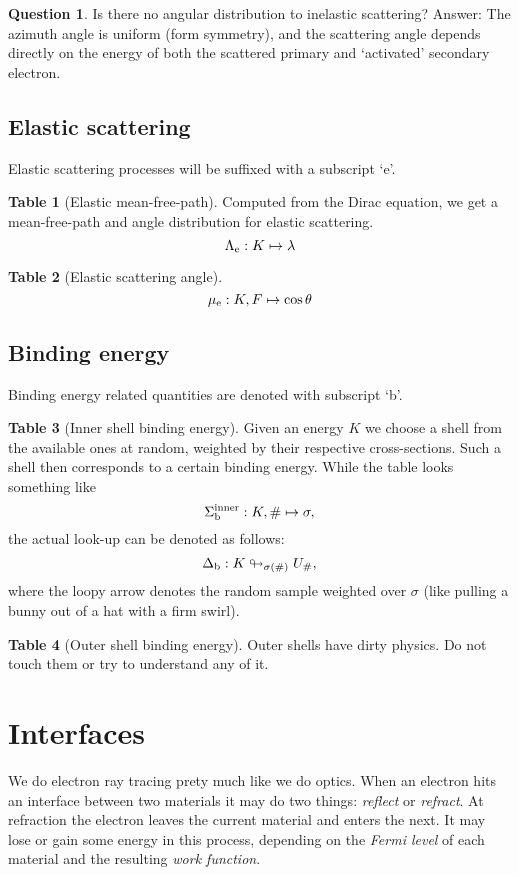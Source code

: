 \documentclass{article}
\theoremstyle{definition}
\newtheorem{question}{Question}
\newtheorem{data-table}{Table}
\begin{document}
\begin{question}
    Is there no angular distribution to inelastic scattering? Answer: The azimuth angle is uniform (form symmetry), and the scattering angle depends directly on the energy of both the scattered primary and `activated' secondary electron.
\end{question}

\subsection{Elastic scattering}
Elastic scattering processes will be suffixed with a subscript `e'.

\begin{data-table}[Elastic mean-free-path]
    Computed from the Dirac equation, we get a mean-free-path and angle distribution for elastic scattering.
    \[{\Lambda}_{\rm e}: K \mapsto \lambda\]
\end{data-table}

\begin{data-table}[Elastic scattering angle]
    \[{\mu}_{\rm e}: K, F \mapsto \cos \theta\]
\end{data-table}

\subsection{Binding energy}
Binding energy related quantities are denoted with subscript `b'.

\begin{data-table}[Inner shell binding energy]
    Given an energy $K$ we choose a shell from the available ones at random, weighted by their respective cross-sections. Such a shell then corresponds to a certain binding energy. While the table looks something like
        \[\Sigma_{\rm b}^{\rm inner}: K, \# \mapsto \sigma,\]
    the actual look-up can be denoted as follows:
        \[\Delta_{\rm b}: K \looparrowright_{\sigma(\#)} U_{\#},\]
    where the loopy arrow denotes the random sample weighted over $\sigma$ (like pulling a bunny out of a hat with a firm swirl).
\end{data-table}

\begin{data-table}[Outer shell binding energy]
    Outer shells have dirty physics. Do not touch them or try to understand any of it.
\end{data-table}

\section{Interfaces}
We do electron ray tracing prety much like we do optics. When an electron hits an interface between two materials it may do two things: \emph{reflect} or \emph{refract}. At refraction the electron leaves the current material and enters the next. It may lose or gain some energy in this process, depending on the \emph{Fermi level} of each material and the resulting \emph{work function}.
\end{document}
